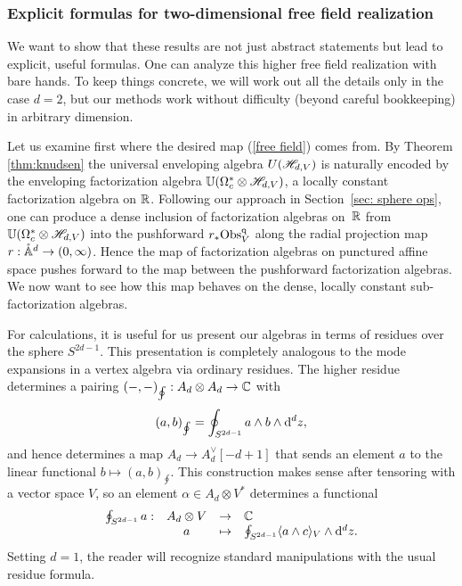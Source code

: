 \subsubsection{Explicit formulas for two-dimensional free field realization}

We want to show that these results are not just abstract statements but lead to explicit, useful formulas.
One can analyze this higher free field realization with bare hands.
To keep things concrete, we will work out all the details only in the case $d=2$, but our methods work without difficulty (beyond careful bookkeeping) in arbitrary dimension.

Let us examine first where the desired map (\ref{free field}) comes from.
By Theorem \ref{thm:knudsen} the universal enveloping algebra $U(\mathscr H_{d,V})$ is naturally encoded by the enveloping factorization algebra $\mathbb U(\Omega^*_c \otimes \mathscr H_{d,V})$,
a locally constant factorization algebra on $\mathbb R$.
Following our approach in Section~\ref{sec: sphere ops},
one can produce a dense inclusion of factorization algebras on~$\mathbb R$ from $\mathbb U(\Omega^*_c \otimes \mathscr H_{d,V})$ into the pushforward $r_* {\rm Obs}^{\rm q}_{V}$ along the radial projection map $r: \mathring{\mathbb A}^d \to (0,\infty)$.
Hence the map of factorization algebras on punctured affine space pushes forward to the map between the pushforward factorization algebras.
We now want to see how this map behaves on the dense, locally constant sub-factorization algebras.

For calculations, it is useful for us present our algebras in terms of residues over the sphere $S^{2d-1}$. 
This presentation is completely analogous to the mode expansions in a vertex algebra via ordinary residues.
The higher residue determines a pairing $(-,-)_{\oint}: A_d \otimes A_d \to   \mathbb C$ with
\[
(a, b)_{\oint} = \oint_{S^{2d-1}} a \wedge b \wedge {\rm d}^d z ,
\]
and hence determines a map $A_d \to A_d^\vee [-d + 1]$ that sends an element $a$ to the linear functional $b \mapsto (a, b)_{\oint}$.
This construction makes sense after tensoring with a vector space $V$,
so an element $\alpha \in A_d \otimes V^*$ determines a functional 
\[
\begin{array}{cccl}
\oint_{S^{2d-1}} a  : & A_d \otimes V & \to & \mathbb C \\
& a & \mapsto & \oint_{S^{2d-1}} \langle a \wedge c\rangle_V \wedge {\rm d}^d z .
\end{array}
\]
Setting $d=1$, the reader will recognize standard manipulations with the usual residue formula.

